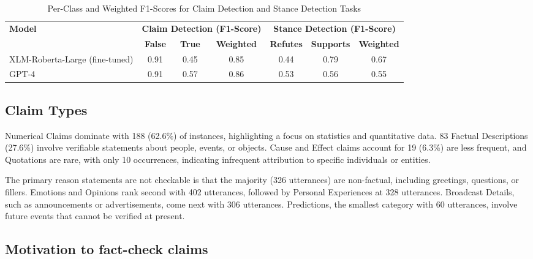 \begin{table*}[h!!!]
\centering
\caption{Per-Class and Weighted F1-Scores for Claim Detection and Stance Detection Tasks}
\label{tab:eval}
\begin{tabular}{lccc|ccc}
\toprule
\multirow{2}{*}{\textbf{Model}} & \multicolumn{3}{c|}{\textbf{Claim Detection (F1-Score)}} & \multicolumn{3}{c}{\textbf{Stance Detection (F1-Score)}} \\ 
\cline{2-7}
                                & \textbf{False} & \textbf{True} & \textbf{Weighted}         & \textbf{Refutes} & \textbf{Supports} & \textbf{Weighted} \\ 
\midrule
XLM-Roberta-Large (fine-tuned)  & 0.91           & 0.45          & 0.85                      & 0.44             & 0.79              & 0.67              \\ 
GPT-4                           & 0.91           & 0.57          & 0.86                      & 0.53             & 0.56              & 0.55              \\ 
\bottomrule
\end{tabular}
\end{table*}






\subsection{Claim Types}

Numerical Claims dominate with 188 (62.6\%)  of instances, highlighting a focus on statistics and quantitative data. 83 Factual Descriptions (27.6\%) involve verifiable statements about people, events, or objects. Cause and Effect claims account for 19 (6.3\%) are less frequent, and Quotations are rare, with only 10 occurrences, indicating infrequent attribution to specific individuals or entities.


The primary reason statements are not checkable is that the majority (326 utterances) are non-factual, including greetings, questions, or fillers. Emotions and Opinions rank second with 402 utterances, followed by Personal Experiences at 328 utterances. Broadcast Details, such as announcements or advertisements, come next with 306 utterances. Predictions, the smallest category with 60 utterances, involve future events that cannot be verified at present.


\subsection{Motivation to fact-check  claims}






